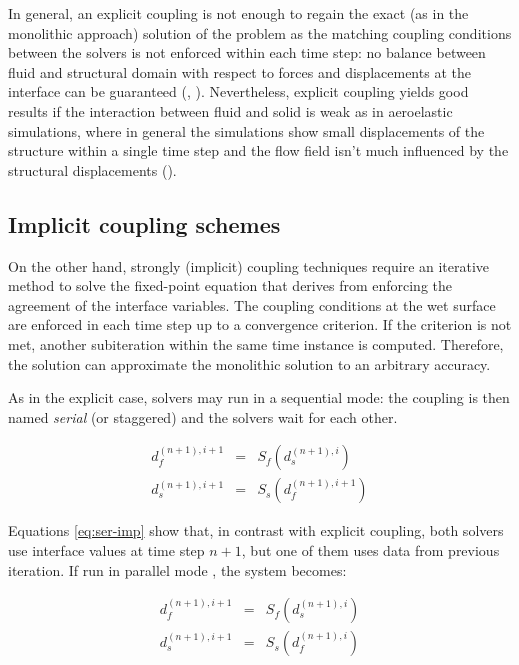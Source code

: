 In general, an explicit coupling is not enough to regain the exact (as in the monolithic approach) solution of the problem as the matching coupling conditions between the solvers is not enforced within each time step: no balance between fluid and structural domain with respect to forces and displacements at the interface can be guaranteed (\cite{hou2012numerical}, \cite{degroote2009performance}). Nevertheless, explicit coupling yields good results if the interaction between fluid and solid is weak as in aeroelastic simulations, where in general the simulations show small displacements of the structure within a single time step and the flow field isn't much influenced by the structural displacements (\cite{farhat2006provably}).

\subsection{Implicit coupling schemes}


On the other hand, strongly (implicit) coupling techniques require an iterative method to solve the fixed-point equation that derives from enforcing the agreement of the interface variables.
The coupling conditions at the wet surface are enforced in each time step up to a convergence criterion. If the criterion is not met, another subiteration within the same time instance is computed. Therefore, the solution can approximate the monolithic solution to an arbitrary accuracy.

As in the explicit case, solvers may run in a sequential mode: the coupling is then named \textit{serial} (or staggered) and the solvers wait for each other. 

\begin{subequations}
	\begin{eqnarray}
		d_f^{(n+1),i+1} &=& S_f\left(d_s^{(n+1),i}\right) \\
		d_s^{(n+1),i+1} &=& S_s\left( d_f^{(n+1),i+1} \right)
	\end{eqnarray} 
	\label{eq:ser-imp}
\end{subequations}

Equations \ref{eq:ser-imp} show that, in contrast with explicit coupling, both solvers use interface values at time step $n+1$, but one of them uses data from previous iteration.
If run in parallel mode \cite{mehl2016parallel}, the system becomes:

\begin{subequations}
	\begin{eqnarray}
		d_f^{(n+1),i+1} &=& S_f\left(d_s^{(n+1),i}\right) \\
		d_s^{(n+1),i+1} &=& S_s\left( d_f^{(n+1),i} \right)
	\end{eqnarray} 
	\label{eq:par-imp}
\end{subequations}

